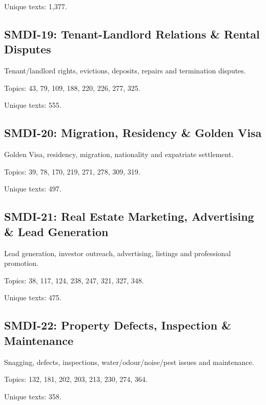 \documentclass[10pt]{article}
\begin{document}
\par Unique texts: 1,377.

\subsection*{SMDI-19: Tenant-Landlord Relations \& Rental Disputes}

Tenant/landlord rights, evictions, deposits, repairs and termination disputes.

\par Topics: 43, 79, 109, 188, 220, 226, 277, 325.

\par Unique texts: 555.

\subsection*{SMDI-20: Migration, Residency \& Golden Visa}

Golden Visa, residency, migration, nationality and expatriate settlement.

\par Topics: 39, 78, 170, 219, 271, 278, 309, 319.

\par Unique texts: 497.

\subsection*{SMDI-21: Real Estate Marketing, Advertising \& Lead Generation}

Lead generation, investor outreach, advertising, listings and professional promotion.

\par Topics: 38, 117, 124, 238, 247, 321, 327, 348.

\par Unique texts: 475.

\subsection*{SMDI-22: Property Defects, Inspection \& Maintenance}

Snagging, defects, inspections, water/odour/noise/pest issues and maintenance.

\par Topics: 132, 181, 202, 203, 213, 230, 274, 364.

\par Unique texts: 358.
\end{document}

